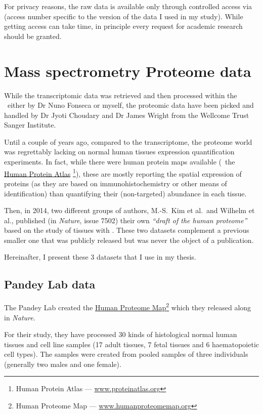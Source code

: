 For privacy reasons, the raw data is available only through controlled access via
 (access number specific to the version of the data I used
in my study). While getting access can take time, in principle every request for
academic research should be granted.

\section{Mass spectrometry Proteome data}\label{sec:ProteoData}

While the transcriptomic data was retrieved and then processed within the \EBI\
either by Dr Nuno Fonseca or myself, the proteomic data have been picked and
handled by Dr Jyoti Choudary and Dr James Wright from the Wellcome Trust
Sanger Institute.

Until a couple of years ago, compared to the transcriptome, the proteome world
was regrettably lacking on normal human tissues expression quantification
experiments. In fact, while there were human protein maps available
(\eg\ the \href{www.proteinatlas}{Human Protein Atlas}%
\footnote{Human Protein Atlas --- \href{http://www.proteinatlas.org}%
{www.proteinatlas.org}}), these
are mostly reporting the spatial expression of proteins (as they are based
on immunohistochemistry or other means of identification) than quantifying
their (non-targeted) abundance in each tissue.

Then, in 2014, two different groups of authors, M.-S.\ Kim et al.\
and Wilhelm et al., published (in \textit{Nature},
issue 7502) their own \emph{``draft of the human proteome''}
based on the study of tissues with \ms. These two datasets complement a previous
smaller one that was publicly released but was never the object of a publication.

Hereinafter, I present these 3 datasets that I use in my thesis.

\subsection{Pandey Lab data}

The Pandey Lab  created the
\href{http://www.humanproteomemap.org/}%
{Human Proteome Map}\footnote{Human Proteome Map --- %
\href{http://www.humanproteomemap.org/}{www.humanproteomemap.org}} which
they released along \paper{\citetitle{PandeyData}} in \emph{Nature}.

For their study, they have processed 30 kinds of histological normal human
tissues and cell line samples (17 adult tissues, 7 fetal tissues and 6
haematopoietic cell types). The samples were created from pooled samples of three
individuals (generally two males and one female).

